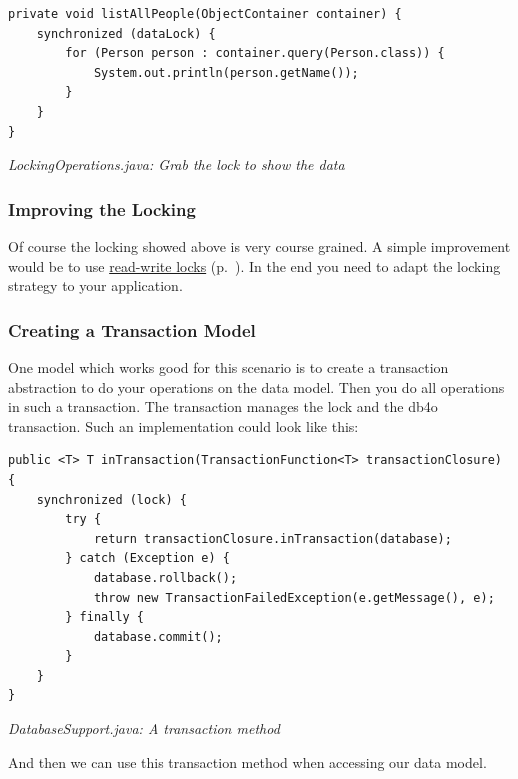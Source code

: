 \begin{lstlisting}
private void listAllPeople(ObjectContainer container) {
    synchronized (dataLock) {
        for (Person person : container.query(Person.class)) {
            System.out.println(person.getName());
        }
    }
}
\end{lstlisting}

{\small\itshape LockingOperations.java: Grab the lock to show the data\par}
\medskip

\subsubsection{Improving the Locking}
\label{ref:advanced-topics-concurrency-share-object-container-threads:improving}

Of course the locking showed above is very course grained. A simple improvement would be to use \hyperref[ref:advanced-topics-concurrency-read-write-lock-example]{read-write locks} (p.~\pageref{ref:advanced-topics-concurrency-read-write-lock-example}). In the end you need to adapt the locking strategy to your application.

\subsubsection{Creating a Transaction Model}
\label{ref:advanced-topics-concurrency-share-object-container-threads:transactionmodel}

One model which works good for this scenario is to create a transaction abstraction to do your operations on the data model. Then you do all operations in such a transaction. The transaction manages the lock and the db4o transaction. Such an implementation could look like this:

\begin{lstlisting}
public <T> T inTransaction(TransactionFunction<T> transactionClosure) {
    synchronized (lock) {
        try {
            return transactionClosure.inTransaction(database);
        } catch (Exception e) {
            database.rollback();
            throw new TransactionFailedException(e.getMessage(), e);
        } finally {
            database.commit();
        }
    }
}
\end{lstlisting}

{\small\itshape DatabaseSupport.java: A transaction method\par}
\medskip

And then we can use this transaction method when accessing our data model.

